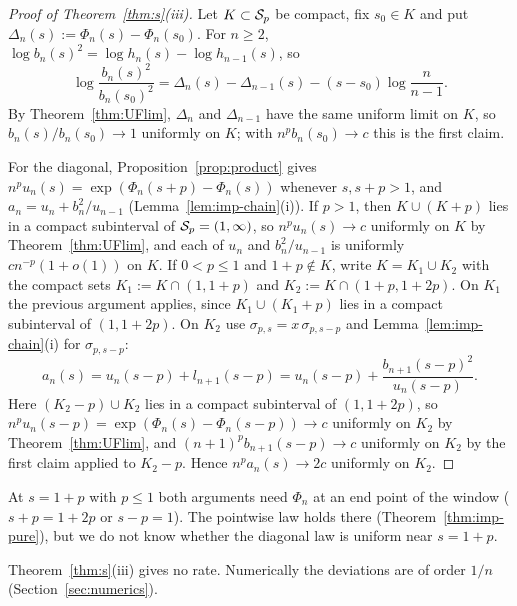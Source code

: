 \begin{proof}[Proof of Theorem~\ref{thm:s}\textup{(iii)}]
Let $K\subset\mathcal{S}_p$ be compact, fix $s_0\in K$ and put $\Delta_n(s):=\Phi_n(s)-\Phi_n(s_0)$. For $n\ge2$,
$\log b_n(s)^2=\log h_n(s)-\log h_{n-1}(s)$, so
\[
  \log\frac{b_n(s)^2}{b_n(s_0)^2}=\Delta_n(s)-\Delta_{n-1}(s)-(s-s_0)\log\frac n{n-1}.
\]
By Theorem~\ref{thm:UFlim}, $\Delta_n$ and $\Delta_{n-1}$ have the same uniform limit on $K$, so $b_n(s)/b_n(s_0)\to1$
uniformly on $K$; with $n^pb_n(s_0)\to c$ this is the first claim.

For the diagonal, Proposition~\ref{prop:product} gives $n^pu_n(s)=\exp(\Phi_n(s+p)-\Phi_n(s))$ whenever $s,s+p>1$, and
$a_n=u_n+b_n^2/u_{n-1}$ (Lemma~\ref{lem:imp-chain}(i)). If $p>1$, then $K\cup(K+p)$ lies in a compact subinterval of
$\mathcal{S}_p=(1,\infty)$, so $n^pu_n(s)\to c$ uniformly on $K$ by Theorem~\ref{thm:UFlim}, and each of $u_n$ and
$b_n^2/u_{n-1}$ is uniformly $cn^{-p}(1+o(1))$ on $K$. If $0<p\le1$ and $1+p\notin K$, write $K=K_1\cup K_2$ with the
compact sets $K_1:=K\cap(1,1+p)$ and $K_2:=K\cap(1+p,1+2p)$. On $K_1$ the previous argument applies, since
$K_1\cup(K_1+p)$ lies in a compact subinterval of $(1,1+2p)$. On $K_2$ use $\sigma_{p,s}=x\,\sigma_{p,s-p}$ and
Lemma~\ref{lem:imp-chain}(i) for $\sigma_{p,s-p}$:
\[
  a_n(s)=u_n(s-p)+l_{n+1}(s-p)=u_n(s-p)+\frac{b_{n+1}(s-p)^2}{u_n(s-p)} .
\]
Here $(K_2-p)\cup K_2$ lies in a compact subinterval of $(1,1+2p)$, so $n^pu_n(s-p)=\exp(\Phi_n(s)-\Phi_n(s-p))\to c$
uniformly on $K_2$ by Theorem~\ref{thm:UFlim}, and $(n+1)^pb_{n+1}(s-p)\to c$ uniformly on $K_2$ by the first claim
applied to $K_2-p$. Hence $n^pa_n(s)\to2c$ uniformly on $K_2$.
\end{proof}

At $s=1+p$ with $p\le1$ both arguments need $\Phi_n$ at an end point of the window ($s+p=1+2p$ or $s-p=1$). The
pointwise law holds there (Theorem~\ref{thm:imp-pure}), but we do not know whether the diagonal law is uniform near
$s=1+p$.

Theorem~\ref{thm:s}(iii) gives no rate. Numerically the deviations are of order $1/n$ (Section~\ref{sec:numerics}).
